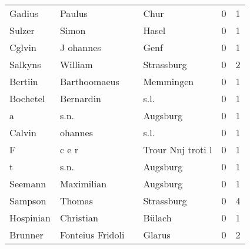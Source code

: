 \begin{tabular}{llllrr}
                   Gadius &                             Paulus &             &                                        Chur &          0 &         1 \\
                   Sulzer &                              Simon &             &                                       Hasel &          0 &         1 \\
                   Cglvin &                          J ohannes &             &                                        Genf &          0 &         1 \\
                  Salkyns &                            William &             &                                  Strassburg &          0 &         2 \\
                  Bertiin &                       Barthoomaeus &             &                                   Memmingen &          0 &         1 \\
                 Bochetel &                          Bernardin &             &                                        s.l. &          0 &         1 \\
                        a &                               s.n. &             &                                    Augsburg &          0 &         1 \\
                   Calvin &                            ohannes &             &                                        s.l. &          0 &         1 \\
                        F &                              c e r &             &                           Trour Nnj troti l &          0 &         1 \\
                        t &                               s.n. &             &                                    Augsburg &          0 &         1 \\
                  Seemann &                         Maximilian &             &                                    Augsburg &          0 &         1 \\
                  Sampson &                             Thomas &             &                                  Strassburg &          0 &         4 \\
                Hospinian &                          Christian &             &                                      Bülach &          0 &         1 \\
                  Brunner &                   Fonteius Fridoli &             &                                      Glarus &          0 &         2 \\

\end{tabular}
